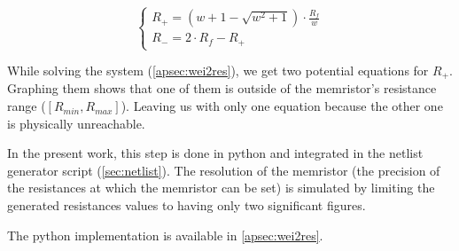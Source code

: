 \begin{equation}
  \label{eq:wei2res2}
  \begin{cases}
    R_+= (w+1-\sqrt{w^2+1})\cdot\frac{R_f}{w}\\
    R_-=2\cdot R_f -R_+
  \end{cases}
\end{equation}

While solving the system (\cref{apsec:wei2res}), we get two potential equations for $R_+$. Graphing them shows that one of them is outside of the memristor's resistance range ($[R_{min},R_{max}]$). Leaving us with only one equation because the other one is physically unreachable.

In the present work, this step is done in python and integrated in the netlist generator script (\cref{sec:netlist}). The resolution of the memristor (the precision of the resistances at which the memristor can be set) is simulated by limiting the generated resistances values to having only two significant figures.

The python implementation is available in \cref{apsec:wei2res}.
